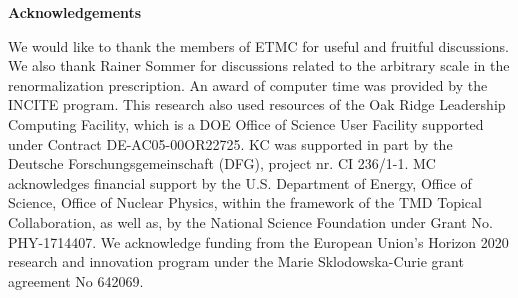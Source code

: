 
\vspace*{1cm}
\begin{center}
{\bf\large{Acknowledgements}}
\end{center}
\medskip
We would like to thank the members of ETMC for useful and fruitful discussions.
We also thank Rainer Sommer for discussions related to the arbitrary scale in the renormalization prescription.
An award of computer time was provided by the INCITE program. This research also used resources of the Oak Ridge Leadership Computing Facility, which is a DOE Office of Science User Facility supported under Contract DE-AC05-00OR22725.
KC was supported in part by the Deutsche Forschungsgemeinschaft (DFG), project nr. CI 236/1-1.
MC acknowledges financial support by the U.S. Department of Energy, Office of Science, Office of Nuclear Physics,
within the framework of the TMD Topical Collaboration, as well as, by the National Science Foundation under Grant No. PHY-1714407.
We acknowledge funding from the European Union's Horizon 2020 research and innovation program
under the Marie Sklodowska-Curie grant agreement No 642069.

